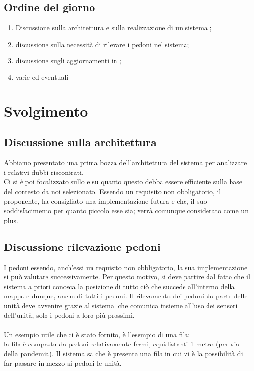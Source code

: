 \documentclass[]{article}
\begin{document}
	\subsection{Ordine del giorno}
	\begin{enumerate}
		\item  Discussione sulla architettura e sulla realizzazione di un sistema ;
		\item  discussione sulla necessità di rilevare i pedoni nel sistema;
		\item  discussione sugli aggiornamenti in ;
		\item  varie ed eventuali.
	\end{enumerate}
	\newpage
	\section{Svolgimento}


	\subsection{Discussione sulla architettura}	
	Abbiamo presentato una prima bozza dell'architettura del sistema per analizzare i relativi dubbi riscontrati. \\
	Ci si è poi focalizzato sullo  e su quanto questo debba essere efficiente sulla base del contesto da noi selezionato. Essendo un requisito non obbligatorio, il proponente, ha consigliato una implementazione futura e che, il suo soddisfacimento per quanto piccolo esse sia; verrà comunque considerato come un plus. 
	 
	\subsection{Discussione rilevazione pedoni}
	I pedoni essendo, anch'essi un requisito non obbligatorio, la sua implementazione si può valutare successivamente. Per questo motivo, si deve partire dal fatto che il sistema a priori conosca la posizione di tutto ciò che succede all'interno della mappa e dunque, anche di tutti i pedoni. 
	Il rilevamento dei pedoni da parte delle unità deve avvenire grazie al sistema, che comunica insieme all'uso dei sensori dell'unità, solo i pedoni a loro più prossimi.
	\\
	\\
	Un esempio utile che ci è stato fornito, è l'esempio di una fila:\\
	la fila è composta da pedoni relativamente fermi, equidistanti 1 metro (per via della pandemia). Il sistema sa che è presenta una fila in cui vi è la possibilità di far passare in mezzo ai pedoni le unità. 
	
\end{document}
